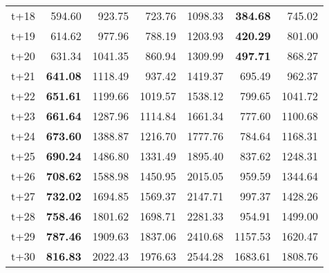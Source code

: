 \begin{table}[H]
\begin{tabular}{lrrrrrr}
t+18  & 594.60  & 923.75  & 723.76  & 1098.33  & \textbf{384.68}  & 745.02  \\
t+19  & 614.62  & 977.96  & 788.19  & 1203.93  & \textbf{420.29}  & 801.00  \\
t+20  & 631.34  & 1041.35  & 860.94  & 1309.99  & \textbf{497.71}  & 868.27  \\
t+21  & \textbf{641.08}  & 1118.49  & 937.42  & 1419.37  & 695.49  & 962.37  \\
t+22  & \textbf{651.61}  & 1199.66  & 1019.57  & 1538.12  & 799.65  & 1041.72  \\
t+23  & \textbf{661.64}  & 1287.96  & 1114.84  & 1661.34  & 777.60  & 1100.68  \\
t+24  & \textbf{673.60}  & 1388.87  & 1216.70  & 1777.76  & 784.64  & 1168.31  \\
t+25  & \textbf{690.24}  & 1486.80  & 1331.49  & 1895.40  & 837.62  & 1248.31  \\
t+26  & \textbf{708.62}  & 1588.98  & 1450.95  & 2015.05  & 959.59  & 1344.64  \\
t+27  & \textbf{732.02}  & 1694.85  & 1569.37  & 2147.71  & 997.37  & 1428.26  \\
t+28  & \textbf{758.46}  & 1801.62  & 1698.71  & 2281.33  & 954.91  & 1499.00  \\
t+29  & \textbf{787.46}  & 1909.63  & 1837.06  & 2410.68  & 1157.53  & 1620.47  \\
t+30  & \textbf{816.83}  & 2022.43  & 1976.63  & 2544.28  & 1683.61  & 1808.76  \\

\bottomrule
\end{tabular}
\end{table}
